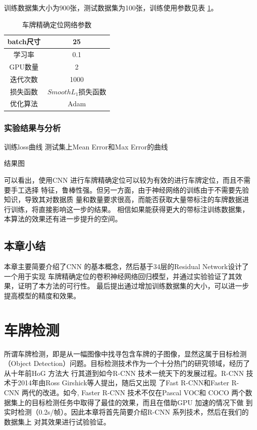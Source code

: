 训练数据集大小为900张，测试数据集为100张，训练使用参数见表 \ref{Tab:LocationArgs}。

\begin{table}[ht]
\centering
\caption{车牌精确定位网络参数}\label{Tab:LocationArgs}
\begin{tabular}{|c|c|}
\hline
batch尺寸 & 25 \\
\hline
学习率 & 0.1 \\
\hline
GPU数量 & 2 \\
\hline
迭代次数 & 1000 \\
\hline
损失函数 & $Smooth L_1$损失函数 \\
\hline
优化算法 & Adam\cite{Kingma:2014us} \\
\hline
\end{tabular}
\end{table}

\subsection{实验结果与分析}

训练loss曲线
测试集上Mean Error和Max Error的曲线

结果图

可以看出，使用CNN 进行车牌精确定位可以较为有效的进行车牌定位，而且不需要手工选择
特征，鲁棒性强。但另一方面，由于神经网络的训练由于不需要先验知识，导致其对数据质
量和数量要求很高，而能否获取大量带标注的车牌数据进行训练，将直接影响这一步的结果。
相信如果能获得更大的带标注训练数据集，本算法的效果还有进一步提升的空间。

\section{本章小结}

本章主要简要介绍了CNN 的基本概念，然后基于34层的Residual Network设计了一个用于实现
车牌精确定位的卷积神经网络回归模型，并通过实验验证了其效果，证明了本方法的可行性。
最后提出通过增加训练数据集的大小，可以进一步提高模型的精度和效果。

\chapter{车牌检测}

所谓车牌检测，即是从一幅图像中找寻包含车牌的子图像，显然这属于目标检测（Object
Detection）问题。目标检测技术作为一个十分热门的研究领域，经历了从十年前HoG 方法大
行其道到如今R-CNN 技术一统天下的发展过程。R-CNN 技术于2014年由Ross Girshick等人提出，随后又出现
了Fast R-CNN和Faster R-CNN 两代的改进。如今, Faster R-CNN 技术不仅在Pascal VOC和
COCO 两个数据集上的目标检测任务中取得了最佳的效果，而且在借助GPU 加速的情况下做
到实时检测（0.2s/帧）。因此本章将首先简要介绍R-CNN 系列技术，然后在我们的数据集上
对其效果进行试验验证。

